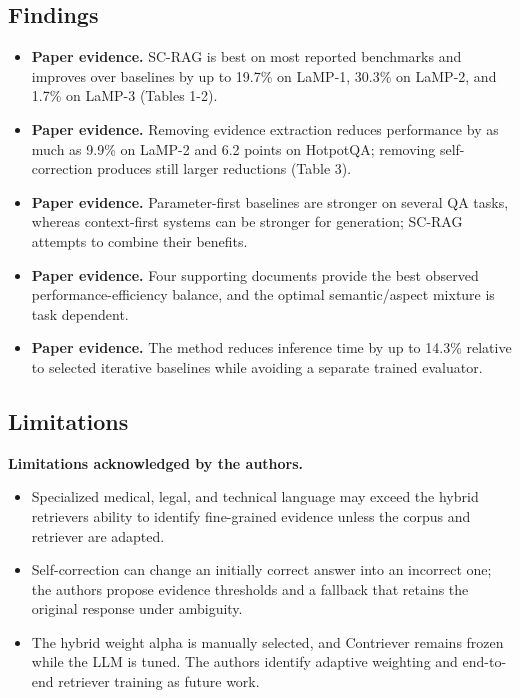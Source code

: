 \documentclass[11pt]{article}
\begin{document}
\subsection{Findings}\label{findings}

\begin{itemize}
\item
  \textbf{Paper evidence.} SC-RAG is best on most reported benchmarks and improves over
  baselines by up to 19.7\% on LaMP-1, 30.3\% on LaMP-2, and 1.7\% on
  LaMP-3 (Tables 1-2).
\item
  \textbf{Paper evidence.} Removing evidence extraction reduces performance by as much
  as 9.9\% on LaMP-2 and 6.2 points on HotpotQA; removing
  self-correction produces still larger reductions (Table 3).
\item
  \textbf{Paper evidence.} Parameter-first baselines are stronger on several QA tasks,
  whereas context-first systems can be stronger for generation; SC-RAG
  attempts to combine their benefits.
\item
  \textbf{Paper evidence.} Four supporting documents provide the best observed
  performance-efficiency balance, and the optimal semantic/aspect
  mixture is task dependent.
\item
  \textbf{Paper evidence.} The method reduces inference time by up to 14.3\% relative
  to selected iterative baselines while avoiding a separate trained
  evaluator.
\end{itemize}

\subsection{Limitations}\label{limitations}

\textbf{Limitations acknowledged by the authors.}

\begin{itemize}
\item
  Specialized medical, legal, and technical language may exceed the
  hybrid retriever\textquotesingle s ability to identify fine-grained
  evidence unless the corpus and retriever are adapted.
\item
  Self-correction can change an initially correct answer into an
  incorrect one; the authors propose evidence thresholds and a fallback
  that retains the original response under ambiguity.
\item
  The hybrid weight alpha is manually selected, and Contriever remains
  frozen while the LLM is tuned. The authors identify adaptive weighting
  and end-to-end retriever training as future work.
\end{itemize}
\end{document}
